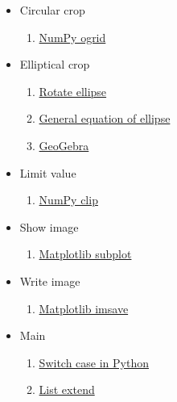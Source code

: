 \documentclass[]{article}
\begin{document}
\begin{itemize}
\begin{enumerate}
  \end{enumerate}
  \item Circular crop
  \begin{enumerate}
    \item \href{https://numpy.org/doc/stable/reference/generated/numpy.ogrid.html}{NumPy ogrid}
  \end{enumerate}
  \item Elliptical crop
  \begin{enumerate}
    \item \href{https://math.stackexchange.com/questions/426150/what-is-the-general-equation-of-the-ellipse-that-is-not-in-the-origin-and-rotate}{Rotate ellipse}
    \item \href{https://www.maa.org/external_archive/joma/Volume8/Kalman/General.html}{General equation of ellipse}
    \item \href{https://geogebra.org/graphing}{GeoGebra}
  \end{enumerate}
  \item Limit value
  \begin{enumerate}
    \item \href{https://numpy.org/doc/stable/reference/generated/numpy.clip.html}{NumPy clip}
  \end{enumerate}
  \item Show image
  \begin{enumerate}
    \item \href{https://matplotlib.org/stable/api/_as_gen/matplotlib.pyplot.subplot.html}{Matplotlib subplot}
  \end{enumerate}
  \item Write image
  \begin{enumerate}
    \item \href{https://matplotlib.org/stable/api/_as_gen/matplotlib.pyplot.imsave.html}{Matplotlib imsave}
  \end{enumerate}
  \item Main
  \begin{enumerate}
    \item \href{https://www.freecodecamp.org/news/python-switch-statement-switch-case-example/}{Switch case in Python}
    \item \href{https://www.w3schools.com/python/ref_list_extend.asp}{List extend}
  \end{enumerate}
\end{itemize}
 
\end{document}
